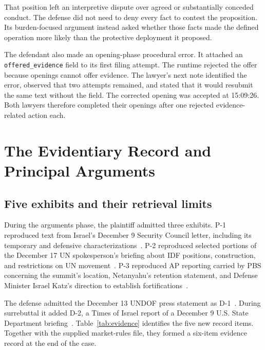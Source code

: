 \documentclass[11pt]{article}
\newcommand{\code}[1]{\texttt{#1}}
\begin{document}
That position left an interpretive dispute over agreed or substantially conceded conduct.  The defense did not need to deny every fact to contest the proposition.  Its burden-focused argument instead asked whether those facts made the defined operation more likely than the protective deployment it proposed.

The defendant also made an opening-phase procedural error.  It attached an \code{offered\_evidence} field to its first filing attempt.  The runtime rejected the offer because openings cannot offer evidence.  The lawyer's next note identified the error, observed that two attempts remained, and stated that it would resubmit the same text without the field.  The corrected opening was accepted at 15:09:26.  Both lawyers therefore completed their openings after one rejected evidence-related action each.

\section{The Evidentiary Record and Principal Arguments}

\subsection{Five exhibits and their retrieval limits}

During the arguments phase, the plaintiff admitted three exhibits.  P-1 reproduced text from Israel's December 9 Security Council letter, including its temporary and defensive characterizations~\cite{p1}.  P-2 reproduced selected portions of the December 17 UN spokesperson's briefing about IDF positions, construction, and restrictions on UN movement~\cite{p2}.  P-3 reproduced AP reporting carried by PBS concerning the summit's location, Netanyahu's retention statement, and Defense Minister Israel Katz's direction to establish fortifications~\cite{p3}.

The defense admitted the December 13 UNDOF press statement as D-1~\cite{d1}.  During surrebuttal it added D-2, a Times of Israel report of a December 9 U.S. State Department briefing~\cite{d2}.  Table~\ref{tab:evidence} identifies the five new record items.  Together with the supplied market-rules file, they formed a six-item evidence record at the end of the case.
\end{document}
